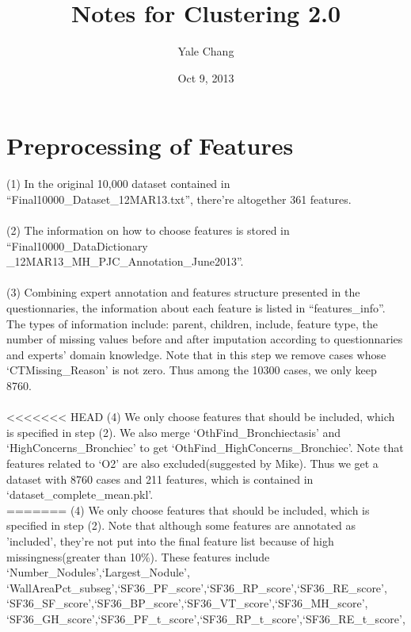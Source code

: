 \documentclass[11pt]{article}
\title{\textbf{Notes for Clustering 2.0}}
\author{Yale Chang}
\date{Oct 9, 2013}
\begin{document}
\maketitle

\section{Preprocessing of Features}
(1) In the original 10,000 dataset contained in ``Final10000\_Dataset\_12MAR13.txt'', there're altogether 361 features.\\
\\ 
(2) The information on how to choose features is stored in ``Final10000\_DataDictionary\\\_12MAR13\_MH\_PJC\_Annotation\_June2013''. \\ 
\\
(3) Combining expert annotation and features structure presented in the questionnaries, the information about each feature is listed in ``features\_info''. The types of information include: parent, children, include, feature type, the number of missing values before and after imputation according to questionnaries and experts' domain knowledge. Note that in this step we remove cases whose `CTMissing\_Reason' is not zero. Thus among the 10300 cases, we only keep 8760. \\
\\
<<<<<<< HEAD
(4) We only choose features that should be included, which is specified in step (2). We also merge `OthFind\_Bronchiectasis' and `HighConcerns\_Bronchiec' to get `OthFind\_HighConcerns\_Bronchiec'. Note that features related to `O2' are also excluded(suggested by Mike). Thus we get a dataset with 8760 cases and 211 features, which is contained in `dataset\_complete\_mean.pkl'. \\
=======
(4) We only choose features that should be included, which is specified in step (2). Note that although some features are annotated as 'included', they're not put into the final feature list because of high missingness(greater than 10\%). These features include `Number\_Nodules',`Largest\_Nodule',\\
`WallAreaPct\_subseg',`SF36\_PF\_score',`SF36\_RP\_score',`SF36\_RE\_score',\\
`SF36\_SF\_score',`SF36\_BP\_score',`SF36\_VT\_score',`SF36\_MH\_score',\\
`SF36\_GH\_score',`SF36\_PF\_t\_score',`SF36\_RP\_t\_score',`SF36\_RE\_t\_score',\\
\end{document}
